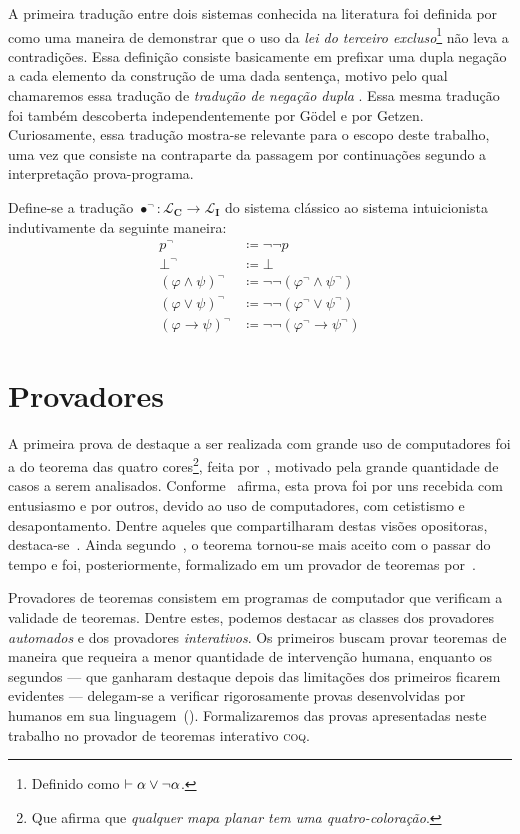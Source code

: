 A primeira tradução entre dois sistemas conhecida na literatura foi definida por~\cite{Kolmogorov} como uma maneira de demonstrar que o uso da \emph{lei do terceiro excluso}\footnote{Definido como $\mathrel{\vdash}\alpha\vee\neg\alpha$.} não leva a contradições. Essa definição consiste basicamente em prefixar uma dupla negação a cada elemento da construção de uma dada sentença, motivo pelo qual chamaremos essa tradução de \emph{tradução de negação dupla} \citep{Coniglio}. Essa mesma tradução foi também descoberta independentemente por Gödel e por Getzen. Curiosamente, essa tradução mostra-se relevante para o escopo deste trabalho, uma vez que consiste na contraparte da passagem por continuações segundo a interpretação prova-programa.

\begin{definition}[$\bullet^\neg$] Define-se a tradução $\bullet^\neg:\mathcal{L}_\mathbf{C}\to\mathcal{L}_\mathbf{I}$ do sistema clássico ao sistema intuicionista indutivamente da seguinte maneira:
    \begin{align*}
        p^\neg&\coloneqq\neg\neg p\\
        \bot^\neg&\coloneqq\bot\\
        {(\varphi\wedge\psi)}^\neg&\coloneqq\neg\neg(\varphi^\neg \wedge \psi^\neg)\\
        {(\varphi\vee\psi)}^\neg&\coloneqq\neg\neg (\varphi^\neg \vee \psi^\neg)\\
        {(\varphi\to\psi)}^\neg&\coloneqq\neg\neg (\varphi^\neg \to \psi^\neg)
        \tag*{\qed} 
    \end{align*}
\end{definition}

\section{Provadores}

A primeira prova de destaque a ser realizada com grande uso de computadores foi a do teorema das quatro cores\footnote{Que afirma que \emph{qualquer mapa planar tem uma quatro-coloração}.}, feita por~\cite{Appel}, motivado pela grande quantidade de casos a serem analisados.
Conforme~\cite{Wilson} afirma, esta prova foi por uns recebida com entusiasmo e por outros, devido ao uso de computadores, com cetistismo e desapontamento.
Dentre aqueles que compartilharam destas visões opositoras, destaca-se~\cite{Tymoczko}.
Ainda segundo~\cite{Wilson}, o teorema tornou-se mais aceito com o passar do tempo e foi, posteriormente, formalizado em um provador de teoremas por~\cite{Gonthier}.

Provadores de teoremas consistem em programas de computador que verificam a validade de teoremas. Dentre estes, podemos destacar as classes dos provadores \emph{automados} e dos provadores \emph{interativos}. Os primeiros buscam provar teoremas de maneira que requeira a menor quantidade de intervenção humana, enquanto os segundos --- que ganharam destaque depois das limitações dos primeiros ficarem evidentes --- delegam-se a verificar rigorosamente provas desenvolvidas por humanos em sua linguagem~(). Formalizaremos das provas apresentadas neste trabalho no provador de teoremas interativo \textsc{coq}.
